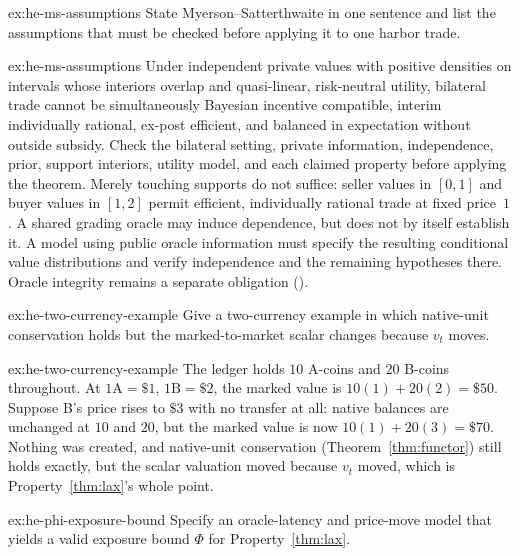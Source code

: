 \documentclass[11pt,a4paper]{article}
\theoremstyle{definition}
\theoremstyle{definition}
\theoremstyle{remark}
\begin{document}
\begin{pdexercise}[kind=Check,rating=1]{ex:he-ms-assumptions}
State Myerson--Satterthwaite in one sentence and list the assumptions that
  must be checked before applying it to one harbor trade.
\end{pdexercise}
\begin{pdsolution}{ex:he-ms-assumptions}
Under independent private values with positive densities on intervals whose
interiors overlap and quasi-linear, risk-neutral utility, bilateral trade cannot
be simultaneously Bayesian incentive compatible, interim individually rational,
ex-post efficient, and balanced in expectation without outside subsidy.
Check the bilateral setting, private information, independence, prior, support
interiors, utility model, and each claimed property before applying the theorem.
Merely touching supports do not suffice: seller values in $[0,1]$ and buyer
values in $[1,2]$ permit efficient, individually rational trade at fixed price~$1$.
A shared grading oracle may induce dependence, but does not by itself establish
it. A model using public oracle information must specify the resulting
conditional value distributions and verify independence and the remaining
hypotheses there. Oracle integrity remains a separate obligation
().
\end{pdsolution}
\begin{pdexercise}[kind=Trace,rating=2]{ex:he-two-currency-example}
Give a two-currency example in which native-unit conservation holds but the
  marked-to-market scalar changes because $v_t$ moves.
\end{pdexercise}
\begin{pdsolution}{ex:he-two-currency-example}
The ledger holds $10$ A-coins and $20$ B-coins throughout. At
$1\text{A}=\$1$, $1\text{B}=\$2$, the marked value is $10(1)+20(2)=\$50$. Suppose
B's price rises to $\$3$ with no transfer at all: native balances are unchanged
at $10$ and $20$, but the marked value is now $10(1)+20(3)=\$70$. Nothing was
created, and native-unit conservation (Theorem~\ref{thm:functor}) still holds
exactly, but the scalar valuation moved because $v_t$ moved, which is
Property~\ref{thm:lax}'s whole point.
\end{pdsolution}
\begin{pdexercise}[kind=Open,rating=3]{ex:he-phi-exposure-bound}
Specify an oracle-latency and price-move model that yields a valid
  exposure bound $\Phi$ for Property~\ref{thm:lax}.
\end{pdexercise}
\end{document}

